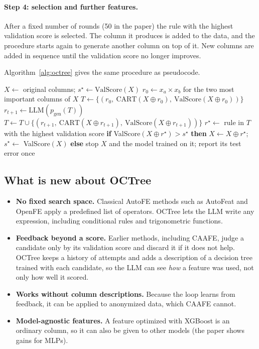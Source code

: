 \documentclass[11pt]{article}
\begin{document}
\paragraph{Step 4: selection and further features.} After a fixed number of rounds (50 in the
paper) the rule with the highest validation score is selected. The column it produces is added to
the data, and the procedure starts again to generate another column on top of it. New columns are
added in sequence until the validation score no longer improves.

Algorithm~\ref{alg:octree} gives the same procedure as pseudocode.

\begin{algorithm}[H]
\caption{OCTree, context-agnostic setting (one dataset split)}\label{alg:octree}
\begin{algorithmic}[1]
\State $X \gets$ original columns; $s^{\star}\gets \text{ValScore}(X)$ 
\Repeat
  \State $r_0 \gets x_a\times x_b$ for the two most important columns of $X$ 
  \State $T\gets\{(r_0,\ \text{CART}(X\oplus r_0),\ \text{ValScore}(X\oplus r_0))\}$ 
    \State $r_{t+1}\gets \text{LLM}(p_{\text{gen}}(T))$ 
    \State $T\gets T\cup\{(r_{t+1},\ \text{CART}(X\oplus r_{t+1}),\ \text{ValScore}(X\oplus r_{t+1}))\}$
  \EndFor
  \State $r^{\star}\gets$ rule in $T$ with the highest validation score 
  \State \textbf{if} ValScore$(X\oplus r^{\star})>s^{\star}$ \textbf{then} $X\gets X\oplus r^{\star}$; $s^{\star}\gets$ ValScore$(X)$ \textbf{else} stop
\State \Return $X$ and the model trained on it; report its test error once
\end{algorithmic}
\end{algorithm}

\subsection{What is new about OCTree}
\begin{itemize}
  \item \textbf{No fixed search space.} Classical AutoFE methods such as AutoFeat and OpenFE apply a
        predefined list of operators. OCTree lets the LLM write any expression, including
        conditional rules and trigonometric functions.
  \item \textbf{Feedback beyond a score.} Earlier methods, including CAAFE, judge a candidate only by
        its validation score and discard it if it does not help. OCTree keeps a history of attempts
        and adds a description of a decision tree trained with each candidate, so the LLM can see
        \emph{how} a feature was used, not only how well it scored.
  \item \textbf{Works without column descriptions.} Because the loop learns from feedback, it can
        be applied to anonymized data, which CAAFE cannot.
  \item \textbf{Model-agnostic features.} A feature optimized with XGBoost is an ordinary column, so
        it can also be given to other models (the paper shows gains for MLPs).
\end{itemize}
\end{document}
